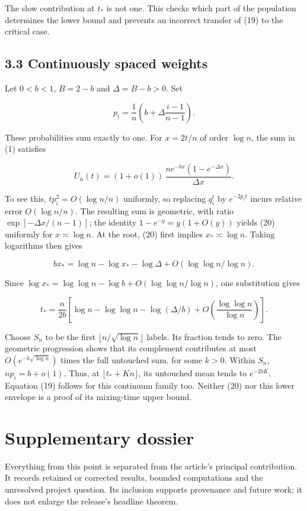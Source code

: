 \documentclass[
  british,
  11pt,
]{article}
\begin{document}
The slow contribution at \(t_*\) is not one. This checks which part of
the population determines the lower bound and prevents an incorrect
transfer of (19) to the critical case.

\subsection{3.3 Continuously spaced
weights}\label{continuously-spaced-weights}

Let \(0<b<1\), \(B=2-b\) and \(\Delta=B-b>0\). Set

\[p_i=\frac1n\left(b+\Delta\frac{i-1}{n-1}\right).\]

These probabilities sum exactly to one. For \(x=2t/n\) of order
\(\log n\), the sum in (1) satisfies

\[
U_n(t)=(1+o(1))\,
\frac{n e^{-bx}(1-e^{-\Delta x})}{\Delta x}. \tag{20}
\]

To see this, \(t p_i^2=O(\log n/n)\) uniformly, so replacing \(q_i^t\)
by \(e^{-2p_it}\) incurs relative error \(O(\log n/n)\). The resulting
sum is geometric, with ratio \(\exp[-\Delta x/(n-1)]\); the identity
\(1-e^{-y}=y(1+O(y))\) yields (20) uniformly for \(x\asymp\log n\). At
the root, (20) first implies \(x_*\asymp\log n\). Taking logarithms then
gives

\[b x_*=\log n-\log x_* -\log\Delta+O(\log\log n/\log n).\]

Since \(\log x_*=\log\log n-\log b+O(\log\log n/\log n)\), one
substitution gives

\[
t_*=\frac n{2b}\left[
\log n-\log\log n-\log(\Delta/b)
+O\!\left(\frac{\log\log n}{\log n}\right)\right]. \tag{21}
\]

Choose \(S_n\) to be the first \(\lfloor n/\sqrt{\log n}\rfloor\)
labels. Its fraction tends to zero. The geometric progression shows that
its complement contributes at most \(O(e^{-k\sqrt{\log n}})\) times the
full untouched sum, for some \(k>0\). Within \(S_n\), \(np_i=b+o(1)\).
Thus, at \(\lfloor t_*+Kn\rfloor\), its untouched mean tends to
\(e^{-2bK}\). Equation (19) follows for this continuum family too.
Neither (20) nor this lower envelope is a proof of its mixing-time upper
bound.

\section{Supplementary dossier}\label{supplementary-dossier}

Everything from this point is separated from the article's principal
contribution. It records retained or corrected results, bounded
computations and the unresolved project question. Its inclusion supports
provenance and future work; it does not enlarge the release's headline
theorem.
\end{document}
